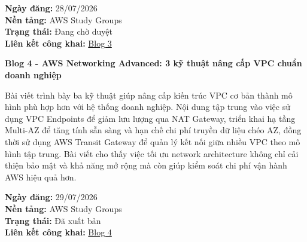 \textbf{Ngày đăng:} 28/07/2026\\
\textbf{Nền tảng:} AWS Study Groups\\
\textbf{Trạng thái:} Đang chờ duyệt\\
\textbf{Liên kết công khai:}
\href{https://www.facebook.com/groups/awsstudygroupfcj/permalink/2227122848052675/\#}{Blog
3}

\vspace{0.5em}\noindent\textbf{Blog 4 - AWS Networking Advanced: 3 kỹ thuật nâng cấp VPC
chuẩn doanh
nghiệp}\par

Bài viết trình bày ba kỹ thuật giúp nâng cấp kiến trúc VPC cơ bản thành
mô hình phù hợp hơn với hệ thống doanh nghiệp. Nội dung tập trung vào
việc sử dụng VPC Endpoints để giảm lưu lượng qua NAT Gateway, triển khai
hạ tầng Multi-AZ để tăng tính sẵn sàng và hạn chế chi phí truyền dữ liệu
chéo AZ, đồng thời sử dụng AWS Transit Gateway để quản lý kết nối giữa
nhiều VPC theo mô hình tập trung. Bài viết cho thấy việc tối ưu network
architecture không chỉ cải thiện bảo mật và khả năng mở rộng mà còn giúp
kiểm soát chi phí vận hành AWS hiệu quả hơn.

\textbf{Ngày đăng:} 29/07/2026\\
\textbf{Nền tảng:} AWS Study Groups\\
\textbf{Trạng thái:} Đã xuất bản\\
\textbf{Liên kết công khai:}
\href{https://www.facebook.com/groups/awsstudygroupfcj/permalink/2225997548165205/\#}{Blog
4}
